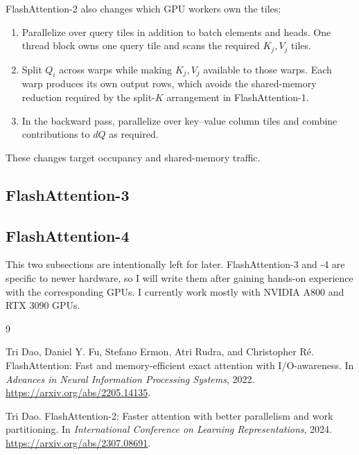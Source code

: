 \documentclass[11pt]{article}
\numberwithin{equation}{section}
\begin{document}
FlashAttention-2 also changes which GPU workers own the tiles:
\begin{enumerate}
  \item Parallelize over query tiles in addition to batch elements and heads.  One
        thread block owns one query tile and scans the required $K_j,V_j$ tiles.
  \item Split $Q_i$ across warps while making $K_j,V_j$ available to those warps.
        Each warp produces its own output rows, which avoids the shared-memory
        reduction required by the split-$K$ arrangement in FlashAttention-1.
  \item In the backward pass, parallelize over key--value column tiles and combine
        contributions to $dQ$ as required.
\end{enumerate}
These changes target occupancy and shared-memory traffic.

\subsection{FlashAttention-3}
\label{sec:fa3}
\subsection{FlashAttention-4}
\label{sec:fa4}

This two subsections are intentionally left for later.  FlashAttention-3 and -4 are specific to
newer hardware, so I will write them after gaining hands-on experience with the
corresponding GPUs.  I currently work mostly with NVIDIA A800 and RTX 3090 GPUs.


\begin{thebibliography}{9}

Tri Dao, Daniel Y. Fu, Stefano Ermon, Atri Rudra, and Christopher R\'e.
\newblock FlashAttention: Fast and memory-efficient exact attention with
I/O-awareness.
\newblock In \emph{Advances in Neural Information Processing Systems}, 2022.
\newblock \url{https://arxiv.org/abs/2205.14135}.

Tri Dao.
\newblock FlashAttention-2: Faster attention with better parallelism and work
partitioning.
\newblock In \emph{International Conference on Learning Representations}, 2024.
\newblock \url{https://arxiv.org/abs/2307.08691}.

\end{thebibliography}
\end{document}

